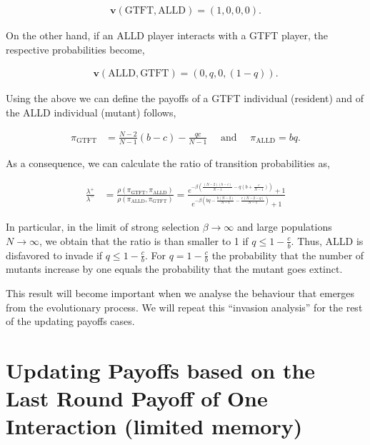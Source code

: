 \documentclass[11pt]{article}
\theoremstyle{plainCl1}
\theoremstyle{plainCl2}
\begin{document}
\begin{align*}
    \mathbf{v}(\text{GTFT}, \text{ALLD}) = (1, 0, 0, 0).
\end{align*}

On the other hand, if an ALLD player interacts with a GTFT player, the
respective probabilities become,

\begin{align*}
  \mathbf{v}(\text{ALLD}, \text{GTFT}) = (0, q, 0, (1 - q)).
\end{align*}

Using the above we can define the payoffs of a GTFT individual (resident)
and of the ALLD individual (mutant) follows,

\begin{align*}
  \displaystyle \pi_{\text{GTFT}} & = \displaystyle \frac{N\!-\!2}{N-1} (b - c)  -	\displaystyle\frac{q c}{N-1} \quad \text{ and } \quad \displaystyle \pi_{\text{ALLD}}  = \displaystyle b q.
\end{align*}

As a consequence, we can calculate the ratio of transition probabilities as,

\begin{align*}
    \frac{\lambda^{+}}{\lambda^{-}} & = \frac{\rho(\pi_{\text{GTFT}}, \pi_{\text{ALLD}})}{\rho(\pi_{\text{ALLD}}, \pi_{\text{GTFT}})}  = \frac{e^{-\beta \left(\frac{(N-2) (b-c)}{N-1} - q (b + \frac{c}{N-1})\right)}+1}
    {e^{-\beta\left(b q - \frac{b (N - 2)}{N-1} - \frac{c (N - 2 - q)}{N-1}\right)}+1}
\end{align*}

In particular, in the limit of strong selection \(\beta \rightarrow \infty\)
and large populations \(N \rightarrow \infty\), we obtain that the ratio is than
smaller to 1 if \(q \leq 1 - \frac{c}{b}\). Thus, ALLD is disfavored to invade
if \(q \leq 1 - \frac{c}{b}\). For \(q = 1 -\frac{c}{b}\) the probability that
the number of mutants increase by one equals the probability that the mutant
goes extinct.

This result will become important when we analyse the behaviour that emerges
from the evolutionary process. We will repeat this ``invasion analysis'' for the
rest of the updating payoffs cases.

\section{Updating Payoffs based on the Last Round Payoff of One Interaction (limited memory)}\label{section:limited_memory}
\end{document}
